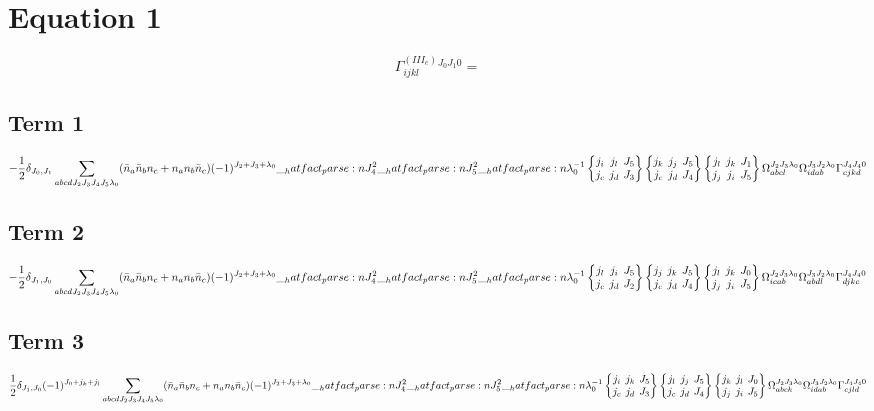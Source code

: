 \documentclass{scrartcl}
\newcommand{\sixj}[6]{\begingroup\setlength{\arraycolsep}{0.2em}\begin{Bmatrix} #1 & #2 & #3 \\ #4 & #5 & #6 \end{Bmatrix}\endgroup}
\begin{document}
\section{Equation 1}
\begin{dmath*}
\Gamma^{(III_c)}_{i j k l}^{{J}_{0} {J}_{1} 0} = 
\end{dmath*}
\subsection{Term 1}
\begin{dmath*}
-\frac{1}{2} \* \delta_{{J}_{0},{J}_{1}} \* \sum_{a b c d {J}_{2} {J}_{3} {J}_{4} {J}_{5} {{\lambda}}_{0}} \* (\bar{n}_{a} \* \bar{n}_{b} \* n_{c} + n_{a} \* n_{b} \* \bar{n}_{c}) \* (-1)^{{J}_{2}+{J}_{3}+{{\lambda}}_{0}} \* \hatfact{{J}_{4}^{2}} \* \hatfact{{J}_{5}^{2}} \* \hatfact{{{\lambda}}_{0}^{-1}} \* \sixj{{j}_{i}}{{j}_{l}}{{J}_{5}}{{j}_{c}}{{j}_{d}}{{J}_{3}} \* \sixj{{j}_{k}}{{j}_{j}}{{J}_{5}}{{j}_{c}}{{j}_{d}}{{J}_{4}} \* \sixj{{j}_{l}}{{j}_{k}}{{J}_{1}}{{j}_{j}}{{j}_{i}}{{J}_{5}} \* \Omega_{a b c l}^{{J}_{2} {J}_{3} {{\lambda}}_{0}} \* \Omega_{i d a b}^{{J}_{3} {J}_{2} {{\lambda}}_{0}} \* \Gamma_{c j k d}^{{J}_{4} {J}_{4} 0}
\end{dmath*}
\subsection{Term 2}
\begin{dmath*}
-\frac{1}{2} \* \delta_{{J}_{1},{J}_{0}} \* \sum_{a b c d {J}_{2} {J}_{3} {J}_{4} {J}_{5} {{\lambda}}_{0}} \* (\bar{n}_{a} \* \bar{n}_{b} \* n_{c} + n_{a} \* n_{b} \* \bar{n}_{c}) \* (-1)^{{J}_{2}+{J}_{3}+{{\lambda}}_{0}} \* \hatfact{{J}_{4}^{2}} \* \hatfact{{J}_{5}^{2}} \* \hatfact{{{\lambda}}_{0}^{-1}} \* \sixj{{j}_{l}}{{j}_{i}}{{J}_{5}}{{j}_{c}}{{j}_{d}}{{J}_{2}} \* \sixj{{j}_{j}}{{j}_{k}}{{J}_{5}}{{j}_{c}}{{j}_{d}}{{J}_{4}} \* \sixj{{j}_{l}}{{j}_{k}}{{J}_{0}}{{j}_{j}}{{j}_{i}}{{J}_{5}} \* \Omega_{i c a b}^{{J}_{2} {J}_{3} {{\lambda}}_{0}} \* \Omega_{a b d l}^{{J}_{3} {J}_{2} {{\lambda}}_{0}} \* \Gamma_{d j k c}^{{J}_{4} {J}_{4} 0}
\end{dmath*}
\subsection{Term 3}
\begin{dmath*}
\frac{1}{2} \* \delta_{{J}_{1},{J}_{0}} \* (-1)^{{J}_{0}+{j}_{k}+{j}_{l}} \* \sum_{a b c d {J}_{2} {J}_{3} {J}_{4} {J}_{5} {{\lambda}}_{0}} \* (\bar{n}_{a} \* \bar{n}_{b} \* n_{c} + n_{a} \* n_{b} \* \bar{n}_{c}) \* (-1)^{{J}_{2}+{J}_{3}+{{\lambda}}_{0}} \* \hatfact{{J}_{4}^{2}} \* \hatfact{{J}_{5}^{2}} \* \hatfact{{{\lambda}}_{0}^{-1}} \* \sixj{{j}_{i}}{{j}_{k}}{{J}_{5}}{{j}_{c}}{{j}_{d}}{{J}_{3}} \* \sixj{{j}_{l}}{{j}_{j}}{{J}_{5}}{{j}_{c}}{{j}_{d}}{{J}_{4}} \* \sixj{{j}_{k}}{{j}_{l}}{{J}_{0}}{{j}_{j}}{{j}_{i}}{{J}_{5}} \* \Omega_{a b c k}^{{J}_{2} {J}_{3} {{\lambda}}_{0}} \* \Omega_{i d a b}^{{J}_{3} {J}_{2} {{\lambda}}_{0}} \* \Gamma_{c j l d}^{{J}_{4} {J}_{4} 0}
\end{dmath*}
\end{document}

